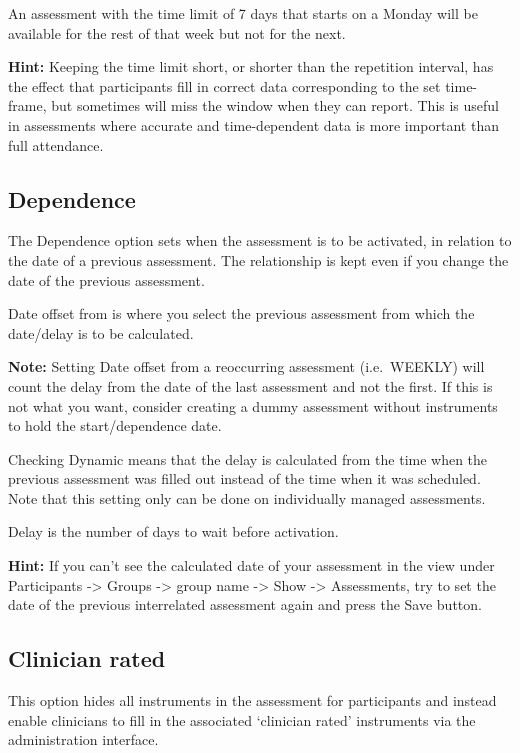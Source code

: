 \documentclass[]{book}
\begin{document}
An assessment with the time limit of 7 days that starts on a Monday will be available for the rest of that week but not for the next.

\textbf{Hint:} Keeping the time limit short, or shorter than the repetition interval, has the effect that participants fill in correct data corresponding to the set time-frame, but sometimes will miss the window when they can report. This is useful in assessments where accurate and time-dependent data is more important than full attendance.

\hypertarget{dependence}{%
\subsection{Dependence}\label{dependence}}

The Dependence option sets when the assessment is to be activated, in relation to the date of a previous assessment. The relationship is kept even if you change the date of the previous assessment.

Date offset from is where you select the previous assessment from which the date/delay is to be calculated.

\textbf{Note:} Setting Date offset from a reoccurring assessment (i.e.~WEEKLY) will count the delay from the date of the last assessment and not the first. If this is not what you want, consider creating a dummy assessment without instruments to hold the start/dependence date.

Checking Dynamic means that the delay is calculated from the time when the previous assessment was filled out instead of the time when it was scheduled. Note that this setting only can be done on individually managed assessments.

Delay is the number of days to wait before activation.

\textbf{Hint:} If you can't see the calculated date of your assessment in the view under Participants -\textgreater{} Groups -\textgreater{} group name -\textgreater{} Show -\textgreater{} Assessments, try to set the date of the previous interrelated assessment again and press the Save button.

\hypertarget{clinician-rated}{%
\subsection{Clinician rated}\label{clinician-rated}}

This option hides all instruments in the assessment for participants and instead enable clinicians to fill in the associated `clinician rated' instruments via the administration interface.
\end{document}

